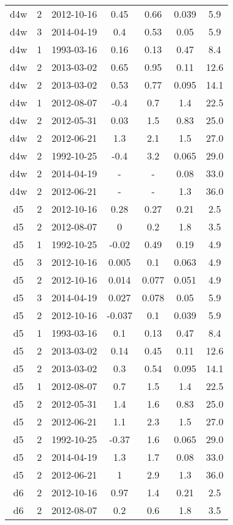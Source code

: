 \begin{table*}[htp]
\begin{tabular}{ccccccc}
d4w & 2 & 2012-10-16 & 0.45 & 0.66 & 0.039 & 5.9 \\
d4w & 3 & 2014-04-19 & 0.4 & 0.53 & 0.05 & 5.9 \\
d4w & 1 & 1993-03-16 & 0.16 & 0.13 & 0.47 & 8.4 \\
d4w & 2 & 2013-03-02 & 0.65 & 0.95 & 0.11 & 12.6 \\
d4w & 2 & 2013-03-02 & 0.53 & 0.77 & 0.095 & 14.1 \\
d4w & 1 & 2012-08-07 & -0.4 & 0.7 & 1.4 & 22.5 \\
d4w & 2 & 2012-05-31 & 0.03 & 1.5 & 0.83 & 25.0 \\
d4w & 2 & 2012-06-21 & 1.3 & 2.1 & 1.5 & 27.0 \\
d4w & 2 & 1992-10-25 & -0.4 & 3.2 & 0.065 & 29.0 \\
d4w & 2 & 2014-04-19 & - & - & 0.08 & 33.0 \\
d4w & 2 & 2012-06-21 & - & - & 1.3 & 36.0 \\
d5 & 2 & 2012-10-16 & 0.28 & 0.27 & 0.21 & 2.5 \\
d5 & 2 & 2012-08-07 & 0 & 0.2 & 1.8 & 3.5 \\
d5 & 1 & 1992-10-25 & -0.02 & 0.49 & 0.19 & 4.9 \\
d5 & 3 & 2012-10-16 & 0.005 & 0.1 & 0.063 & 4.9 \\
d5 & 2 & 2012-10-16 & 0.014 & 0.077 & 0.051 & 4.9 \\
d5 & 3 & 2014-04-19 & 0.027 & 0.078 & 0.05 & 5.9 \\
d5 & 2 & 2012-10-16 & -0.037 & 0.1 & 0.039 & 5.9 \\
d5 & 1 & 1993-03-16 & 0.1 & 0.13 & 0.47 & 8.4 \\
d5 & 2 & 2013-03-02 & 0.14 & 0.45 & 0.11 & 12.6 \\
d5 & 2 & 2013-03-02 & 0.3 & 0.54 & 0.095 & 14.1 \\
d5 & 1 & 2012-08-07 & 0.7 & 1.5 & 1.4 & 22.5 \\
d5 & 2 & 2012-05-31 & 1.4 & 1.6 & 0.83 & 25.0 \\
d5 & 2 & 2012-06-21 & 1.1 & 2.3 & 1.5 & 27.0 \\
d5 & 2 & 1992-10-25 & -0.37 & 1.6 & 0.065 & 29.0 \\
d5 & 2 & 2014-04-19 & 1.3 & 1.7 & 0.08 & 33.0 \\
d5 & 2 & 2012-06-21 & 1 & 2.9 & 1.3 & 36.0 \\
d6 & 2 & 2012-10-16 & 0.97 & 1.4 & 0.21 & 2.5 \\
d6 & 2 & 2012-08-07 & 0.2 & 0.6 & 1.8 & 3.5 \\

\end{tabular}
\end{table*}
